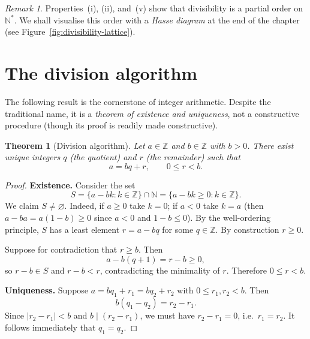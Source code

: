 \documentclass[12pt,a4paper,openany]{book}
\theoremstyle{definition}
\theoremstyle{plain}
\newtheorem{theorem}[definition]{Theorem}
\theoremstyle{remark}
\newtheorem{remark}[definition]{Remark}
\newcommand{\N}{\mathbb{N}}
\newcommand{\Z}{\mathbb{Z}}
\newcommand{\abs}[1]{\left|#1\right|}
\begin{document}
\begin{remark}
\label{rem:divides-partial-order}
Properties~(i), (ii), and~(v) show that divisibility is a partial order on
$\N^{*}$. We shall visualise this order with a \emph{Hasse diagram} at the end
of the chapter (see Figure~\ref{fig:divisibility-lattice}).
\end{remark}

\section{The division algorithm}
\label{sec:division-algorithm}

The following result is the cornerstone of integer arithmetic. Despite the
traditional name, it is a \emph{theorem of existence and uniqueness}, not a
constructive procedure (though its proof is readily made constructive).

\begin{theorem}[Division algorithm]
\label{thm:division-algorithm}
Let $a \in \Z$ and $b \in \Z$ with $b > 0$. There exist unique integers
$q$ (the \emph{quotient}) and $r$
(the \emph{remainder}) such that
\[
  a = bq + r, \qquad 0 \le r < b.
\]
\end{theorem}

\begin{proof}
\textbf{Existence.}
Consider the set
\[
  S = \{ a - bk : k \in \Z \} \cap \N = \{ a - bk \ge 0 : k \in \Z \}.
\]
We claim $S \ne \varnothing$. Indeed, if $a \ge 0$ take $k = 0$; if $a < 0$
take $k = a$ (then $a - ba = a(1-b) \ge 0$ since $a < 0$ and $1 - b \le 0$).
By the well-ordering principle, $S$ has a
least element $r = a - bq$ for some $q \in \Z$. By construction $r \ge 0$.

Suppose for contradiction that $r \ge b$. Then
\[
  a - b(q+1) = r - b \ge 0,
\]
so $r - b \in S$ and $r - b < r$, contradicting the minimality of $r$.
Therefore $0 \le r < b$.

\medskip
\textbf{Uniqueness.}
Suppose $a = bq_1 + r_1 = bq_2 + r_2$ with $0 \le r_1, r_2 < b$. Then
\[
  b(q_1 - q_2) = r_2 - r_1.
\]
Since $\abs{r_2 - r_1} < b$ and $b \mid (r_2 - r_1)$, we must have
$r_2 - r_1 = 0$, i.e.\ $r_1 = r_2$. It follows immediately that $q_1 = q_2$.
\end{proof}
\end{document}
